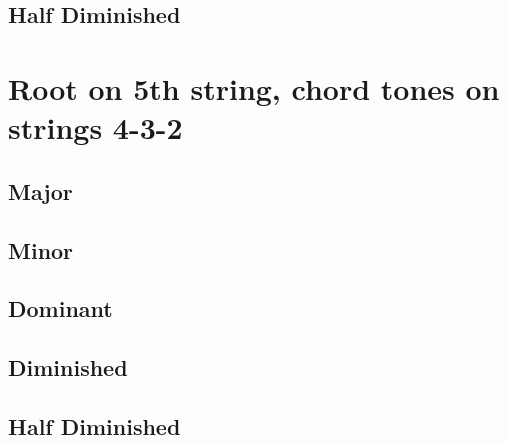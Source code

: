 \subsection{Half Diminished}

\section{Root on 5th string, chord tones on strings 4-3-2}

\subsection{Major}

\subsection{Minor}

\subsection{Dominant}

\subsection{Diminished}

\subsection{Half Diminished}
